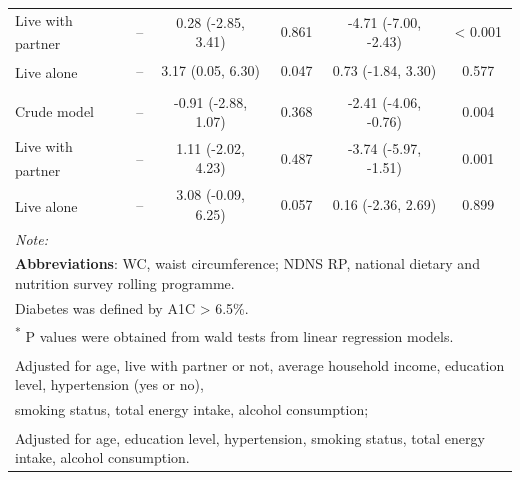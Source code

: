 \begin{table}[H]
\begin{tabular}[t]{lccccc}
		\hspace{1em}\hspace{1em}Live with partner\textsuperscript{\ddag} & -- & 0.28 (-2.85, 3.41) & 0.861 & -4.71 (-7.00, -2.43) & < 0.001\\
		\hspace{1em}\hspace{1em}Live alone\textsuperscript{\ddag} & -- & 3.17 (0.05, 6.30) & 0.047 & 0.73 (-1.84, 3.30) & 0.577\\
		\addlinespace[0.3em]
		\multicolumn{6}{l}{\hspace{1em}\textbf{WC in non-diabetics}}\\
		\hspace{1em}\hspace{1em}Crude model & -- & -0.91 (-2.88, 1.07) & 0.368 & -2.41 (-4.06, -0.76) & 0.004\\
		\hspace{1em}\hspace{1em}Live with partner\textsuperscript{\ddag} & -- & 1.11 (-2.02, 4.23) & 0.487 & -3.74 (-5.97, -1.51) & 0.001\\
		\hspace{1em}\hspace{1em}Live alone\textsuperscript{\ddag} & -- & 3.08 (-0.09, 6.25) & 0.057 & 0.16 (-2.36, 2.69) & 0.899\\
		\bottomrule
		\multicolumn{6}{l}{{\scriptsize \textit{Note: }}}\\
		\multicolumn{6}{l}{{\scriptsize \textbf{Abbreviations}: WC, waist circumference; NDNS RP, national dietary and nutrition survey rolling programme.}}\\
		\multicolumn{6}{l}{{\scriptsize Diabetes was defined by A1C > 6.5\%. }}\\
		\multicolumn{6}{l}{{\scriptsize \textsuperscript{*} P values were obtained from wald tests from linear regression models.}}\\
		\multicolumn{6}{l}{{\scriptsize \textsuperscript{\dag} Adjusted for age, live with partner or not, average household income, education level, hypertension (yes or no),}}\\
		\multicolumn{6}{l}{{\scriptsize smoking status, total energy intake, alcohol consumption;}}\\
		\multicolumn{6}{l}{{\scriptsize \textsuperscript{\ddag} Adjusted for age, education level, hypertension, smoking status, total energy intake, alcohol consumption.}}\\
	\end{tabular}
\end{table}
\vspace{-0.3cm}

